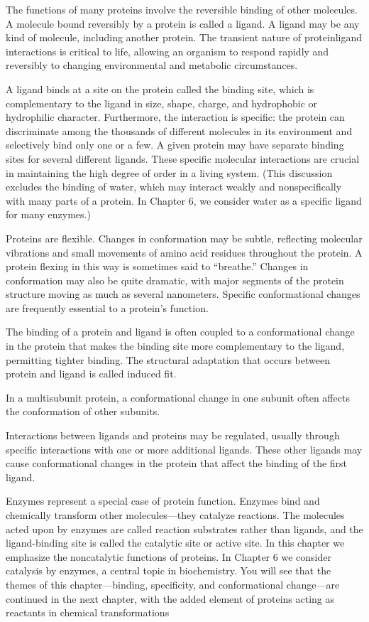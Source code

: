 The functions of many proteins involve the reversible binding of other molecules. A molecule bound reversibly by a protein is called a ligand. A ligand may be any kind of molecule, including another protein. The transient nature of proteinligand interactions is critical to life, allowing an organism to respond rapidly and reversibly to changing environmental and metabolic circumstances. 

A ligand binds at a site on the protein called the binding site, which is complementary to the ligand in size, shape, charge, and hydrophobic or hydrophilic character. Furthermore, the interaction is specific: the protein can discriminate among the thousands of different molecules in its environment and selectively bind only one or a few. A given protein may have separate binding sites for several different ligands. These specific molecular interactions are crucial in maintaining the high degree of order in a living system. (This discussion excludes the binding of water, which may interact weakly and nonspecifically with many parts of a protein. In Chapter 6, we consider water as a specific ligand for many enzymes.) 

Proteins are flexible. Changes in conformation may be subtle, reflecting molecular vibrations and small movements of amino acid residues throughout the protein. A protein flexing in this way is sometimes said to “breathe.” Changes in conformation may also be quite dramatic, with major segments of the protein structure moving as much as several nanometers. Specific conformational changes are frequently essential to a protein’s function. 

The binding of a protein and ligand is often coupled to a conformational change in the protein that makes the binding site more complementary to the ligand, permitting tighter binding. The structural adaptation that occurs between protein and ligand is called induced fit. 

In a multisubunit protein, a conformational change in one subunit often affects the conformation of other subunits. 

Interactions between ligands and proteins may be regulated, usually through specific interactions with one or more additional ligands. These other ligands may cause conformational changes in the protein that affect the binding of the first ligand.

Enzymes represent a special case of protein function. Enzymes bind and chemically transform other molecules—they catalyze reactions. The molecules acted upon by enzymes are called reaction substrates rather than ligands, and the ligand-binding site is called the catalytic site or active site. In this chapter we emphasize the noncatalytic functions of proteins. In Chapter 6 we consider catalysis by enzymes, a central topic in biochemistry. You will see that the themes of this chapter—binding, specificity, and conformational change—are continued in the next chapter, with the added element of proteins acting as reactants in chemical transformations
\cite{nelson2008lehninger}



